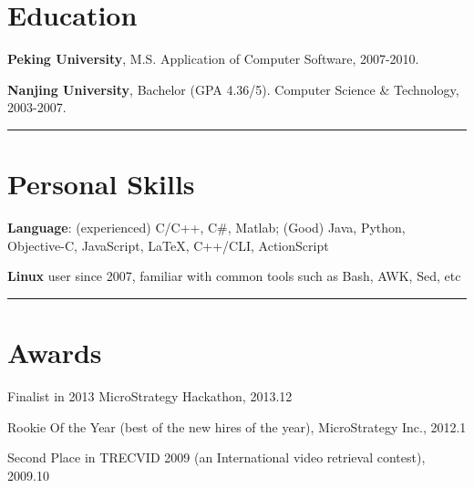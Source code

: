 \documentclass[letterpaper]{article}
\renewenvironment{itemize}{
\begin{list}{*}{
    \setlength{\leftmargin}{1.5em}
    \setlength{\itemsep}{0pt}
  }
}{
  \end{list}
}
\begin{document}
\section*{Education}
\begin{itemize}
	\item \textbf{Peking University}, M.S. Application of Computer Software, 2007-2010.
	\item \textbf{Nanjing University}, Bachelor (GPA 4.36/5). Computer Science \& Technology, 2003-2007.
\end{itemize}

\rule{16.8cm}{0.1em}

\vspace{-1em}
\section*{Personal Skills}
\begin{itemize}
\item \textbf{Language}: (experienced) C/C++, C\#, Matlab; (Good) Java, Python, Objective-C, JavaScript, \LaTeX, C++/CLI, ActionScript
\item \textbf{Linux} user since 2007, familiar with common tools such as Bash, AWK, Sed, etc
\end{itemize}

\rule{16.8cm}{0.1em}

\vspace{-1em}
\section*{Awards}
\begin{itemize}
\item Finalist in 2013 MicroStrategy Hackathon, 2013.12
\item Rookie Of the Year (best of the new hires of the year), MicroStrategy Inc., 2012.1
\item Second Place in TRECVID 2009 (an International video retrieval contest), 2009.10
\end{itemize}
\end{document}
